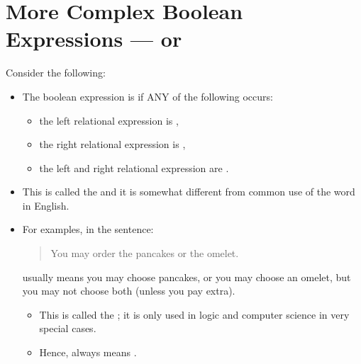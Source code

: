 \documentclass[letterpaper,10pt,english]{sphinxmanual}
\begin{document}
\section{More Complex Boolean Expressions — or}
\label{\detokenize{lecture_notes/lec06_conditionals1:more-complex-boolean-expressions-or}}
Consider the following:
\begin{quote}

\begin{sphinxVerbatim}[commandchars=\\\{\}]
  
  
       
\end{sphinxVerbatim}
\end{quote}
\begin{itemize}
\item {} 
The boolean expression is  if ANY of the following occurs:
\begin{itemize}
\item {} 
the left relational expression is ,

\item {} 
the right relational expression is ,

\item {} 
 the left and right relational expression are .

\end{itemize}

\item {} 
This is called the  and it is somewhat different from
common use of the word  in English.

\item {} 
For examples, in the sentence:
\begin{quote}

You may order the pancakes or the omelet.
\end{quote}

usually means you may choose pancakes, or you may choose an omelet,
but you may not choose both (unless you pay extra).
\begin{itemize}
\item {} 
This is called the ; it is only used in logic and
computer science in very special cases.

\item {} 
Hence,  always means .

\end{itemize}

\end{itemize}
\end{document}
